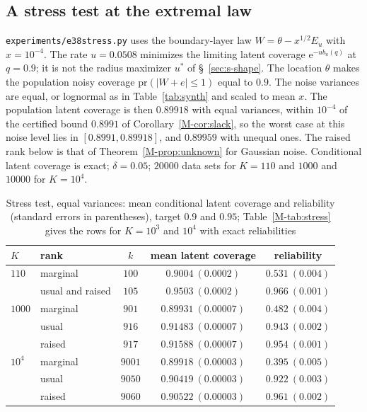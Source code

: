 \documentclass[11pt]{article}
\renewcommand{\_}{\usc\allowbreak}
\newcommand{\pr}{\mathrm{pr}}
\begin{document}
\subsection*{A stress test at the extremal law}

\texttt{experiments/e38\_stress.py} uses the boundary-layer law $W = \theta - x^{1/2}E_u$ with $x = 10^{-4}$. The rate $u = 0.0508$ minimizes the limiting latent coverage $\mathrm{e}^{-ub_u(q)}$ at $q = 0.9$; it is not the radius maximizer $u^*$ of \S~\ref{sec:s-shape}. The location $\theta$ makes the population noisy coverage $\pr(|W + e| \le 1)$ equal to $0.9$. The noise variances are equal, or lognormal as in Table~\ref{tab:synth} and scaled to mean $x$. The population latent coverage is then $0.89918$ with equal variances, within $10^{-4}$ of the certified bound $0.8991$ of Corollary~\ref{M-cor:slack}, so the worst case at this noise level lies in $[0.8991, 0.89918]$, and $0.89959$ with unequal ones. The raised rank below is that of Theorem~\ref{M-prop:unknown} for Gaussian noise. Conditional latent coverage is exact; $\delta = 0.05$; $20000$ data sets for $K = 110$ and $1000$ and $10000$ for $K = 10^4$.

\begin{table}[h]
\centering
\caption{Stress test, equal variances: mean conditional latent coverage and reliability (standard errors in parentheses), target $0.9$ and $0.95$; Table~\ref{M-tab:stress} gives the rows for $K = 10^3$ and $10^4$ with exact reliabilities}
\label{tab:s-stress}
\begin{tabular}{llccc}
\toprule
$K$ & rank & $k$ & mean latent coverage & reliability \\
\midrule
$110$ & marginal & $100$ & $0.9004\ (0.0002)$ & $0.531\ (0.004)$ \\
 & usual and raised & $105$ & $0.9503\ (0.0002)$ & $0.966\ (0.001)$ \\
$1000$ & marginal & $901$ & $0.89931\ (0.00007)$ & $0.482\ (0.004)$ \\
 & usual & $916$ & $0.91483\ (0.00007)$ & $0.943\ (0.002)$ \\
 & raised & $917$ & $0.91588\ (0.00007)$ & $0.954\ (0.001)$ \\
$10^4$ & marginal & $9001$ & $0.89918\ (0.00003)$ & $0.395\ (0.005)$ \\
 & usual & $9050$ & $0.90419\ (0.00003)$ & $0.922\ (0.003)$ \\
 & raised & $9060$ & $0.90522\ (0.00003)$ & $0.961\ (0.002)$ \\
\bottomrule
\end{tabular}
\end{table}
\end{document}
